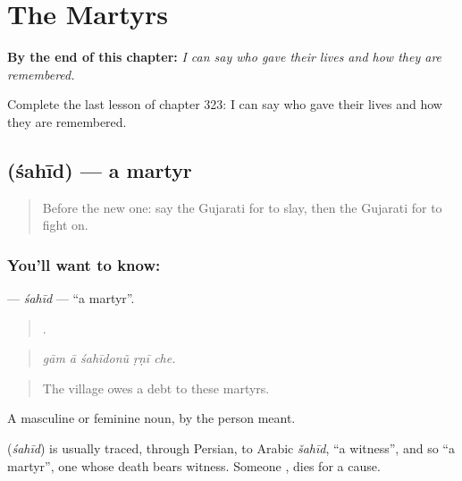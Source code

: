 
\chapter{The Martyrs}
\label{ch:gu-the-martyrs}

\begin{chapteropening}
\textbf{By the end of this chapter:} \emph{I can say who gave their lives and how they are remembered.}

Complete the last lesson of chapter 323: I can say who gave their lives and how they are remembered.
\end{chapteropening}

\section[\texorpdfstring{\gu{શહીદ} (śahīd)}{શહીદ (śahīd)}]{ (śahīd) — a martyr}

\label{lesson:GU-C323-sahid}



\begin{quote}
Before the new one: say the Gujarati for to slay, then the Gujarati for to fight on.
\end{quote}

\subsection*{You'll want to know: }
\textbf{} — \emph{śahīd} — \textquotedblleft{}a martyr\textquotedblright{}.

\begin{quote}
    .
\end{quote}

\begin{quote}
\emph{gām ā śahīdonũ ṛṇī che.}
\end{quote}

\begin{quote}
The village owes a debt to these martyrs.
\end{quote}

A masculine or feminine noun, by the person meant.

\begin{cousinweb}
\textbf{} (\emph{śahīd}) is usually traced, through Persian, to Arabic \emph{šahīd}, \textquotedblleft{}a witness\textquotedblright{}, and so \textquotedblleft{}a martyr\textquotedblright{}, one whose death bears witness. Someone \textbf{  }, dies for a cause.
\end{cousinweb}

